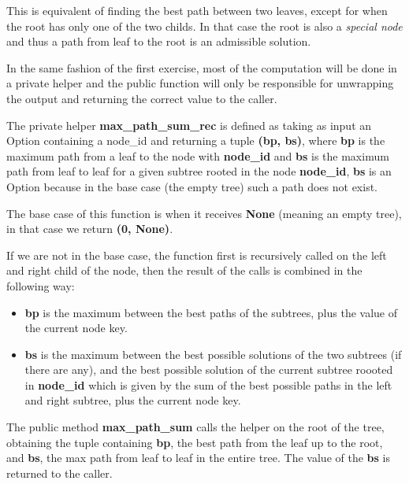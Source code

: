 \documentclass[12pt,a4paper]{article}
\begin{document}
This is equivalent of finding the best path between two leaves, except for when the root has only one of the two childs. In that case the root is also a \textit{special node} and thus a path from leaf to the root is an admissible solution. 

In the same fashion of the first exercise, most of the computation will be done in a private helper and the public function will only be responsible for unwrapping the output and returning the correct value to the caller.

The private helper \textbf{max\_path\_sum\_rec} is defined as taking as input an Option containing a node\_id and returning a tuple \textbf{(bp, bs)}, where \textbf{bp} is the maximum path from a leaf to the node with \textbf{node\_id} and \textbf{bs} is the maximum path from leaf to leaf for a given subtree rooted in the node \textbf{node\_id}, \textbf{bs} is an Option because in the base case (the empty tree) such a path does not exist.

The base case of this function is when it receives \textbf{None} (meaning an empty tree), in that case we return \textbf{(0, None)}.

If we are not in the base case, the function first is recursively called on the left and right child of the node, then the result of the calls is combined in the following way:

\begin{itemize}
    \item \textbf{bp} is the maximum between the best paths of the subtrees, plus the value of the current node key.
    \item \textbf{bs} is the maximum between the best possible solutions of the two subtrees (if there are any), and the best possible solution of the current subtree roooted in \textbf{node\_id} which is given by the sum of the best possible paths in the left and right subtree, plus the current node key. 
\end{itemize}

The public method \textbf{max\_path\_sum} calls the helper on the root of the tree, obtaining the tuple containing \textbf{bp}, the best path from the leaf up to the root, and \textbf{bs}, the max path from leaf to leaf in the entire tree. The value of the \textbf{bs} is returned to the caller.
\end{document}
